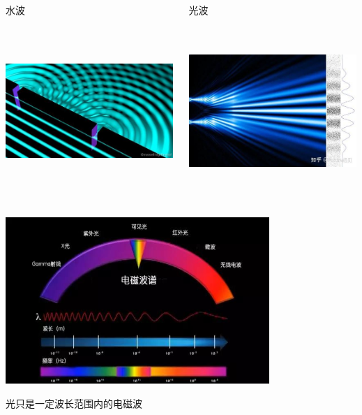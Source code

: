 \begin{frame}
	\begin{columns}
		\begin{column}[t]{0.46\linewidth}
            水波
            \begin{center}
                \includegraphics[width=2.5in,height=2.5in]{figs/2021-12-02-15-46-16.png}
            \end{center}
		\end{column}
		\begin{column}[t]{0.46\linewidth}
            光波
            \begin{center}
                \includegraphics[width=2.5in,height=2.5in]{figs/2021-12-02-15-49-36.png}
            \end{center}
		\end{column}
	\end{columns}
\end{frame}

\begin{frame} 
    \begin{center}
        \includegraphics[width=0.75\textwidth]{figs/2021-12-02-16-23-16.png}
    \end{center}
    光只是一定波长范围内的电磁波
\end{frame}

